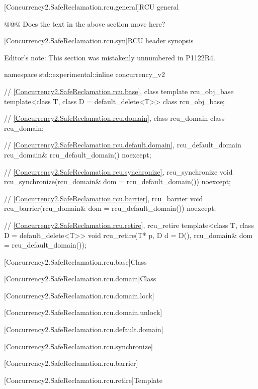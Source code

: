 [Concurrency2.SafeReclamation.rcu.general]{RCU general}

@@@ Does the text in the above section move here?

[Concurrency2.SafeReclamation.rcu.syn]{RCU header  synopsis}

Editor's note: This section was mistakenly unnumbered in P1122R4.


\begin{codeblock}
namespace std::experimental::inline concurrency_v2 {
  // \ref{Concurrency2.SafeReclamation.rcu.base}, class template rcu_obj_base
  template<class T, class D = default_delete<T>>
    class rcu_obj_base;

  // \ref{Concurrency2.SafeReclamation.rcu.domain}, class rcu_domain
  class rcu_domain;

  // \ref{Concurrency2.SafeReclamation.rcu.default.domain}, rcu_default_domain
  rcu_domain& rcu_default_domain() noexcept;

  // \ref{Concurrency2.SafeReclamation.rcu.synchronize}, rcu_synchronize
  void rcu_synchronize(rcu_domain& dom = rcu_default_domain()) noexcept;

  // \ref{Concurrency2.SafeReclamation.rcu.barrier}, rcu_barrier
  void rcu_barrier(rcu_domain& dom = rcu_default_domain()) noexcept;

  // \ref{Concurrency2.SafeReclamation.rcu.retire}, rcu_retire
  template<class T, class D = default_delete<T>>
    void rcu_retire(T* p, D d = D(), rcu_domain& dom = rcu_default_domain());
}
\end{codeblock}

[Concurrency2.SafeReclamation.rcu.base]{Class }

[Concurrency2.SafeReclamation.rcu.domain]{Class }

[Concurrency2.SafeReclamation.rcu.domain.lock]{}

[Concurrency2.SafeReclamation.rcu.domain.unlock]{}

[Concurrency2.SafeReclamation.rcu.default.domain]{}

[Concurrency2.SafeReclamation.rcu.synchronize]{}

[Concurrency2.SafeReclamation.rcu.barrier]{}

[Concurrency2.SafeReclamation.rcu.retire]{Template }
